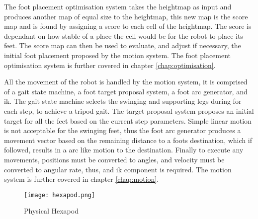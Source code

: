 The foot placement optimisation system takes the heightmap as input and produces another map of equal size to the heightmap, this new map is the score map and is found by assigning a score to each
cell of the heightmap. The score is dependant on how stable of a place the cell would be for the robot to place its feet. The score map can then be used to evaluate, and adjust if necessary, the
initial foot placement proposed by the motion system. The foot placement optimisation system is further covered in chapter \ref{chap:optimisation}.

All the movement of the robot is handled by the motion system, it is comprised of a gait state machine, a foot target proposal system, a foot arc generator, and \ac{ik}.
The gait state machine selects the swinging and supporting legs during for each step, to achieve a tripod gait. The target proposal system proposes an initial target for all the feet based
on the current step parameters. Simple linear motion is not acceptable for the swinging feet, thus the foot arc generator produces a movement vector based on the remaining distance to a foots destination,
which if followed, results in a arc like motion to the destination. Finally to execute any movements, positions must be converted to angles, and velocity must be converted to
angular rate, thus, and \ac{ik} component is required. The motion system is further covered in chapter \ref{chap:motion}.

\begin{figure}[h]
    \centering
    \texttt{[image: hexapod.png]}
    \caption{Physical Hexapod}
    \label{fig:hexapod}
\end{figure}
